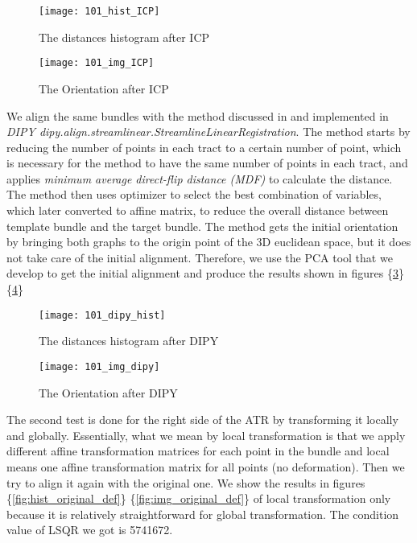 \documentclass[../structure.tex]{subfiles}
\begin{document}
\begin{figure}[h!]
\centering
\texttt{[image: 101\_hist\_ICP]}
\captionsetup{justification=centering}
\caption{The distances histogram after ICP}
\label{fig:hist_ICP}
\end{figure}

\begin{figure}[h!]
\centering
\texttt{[image: 101\_img\_ICP]}
\captionsetup{justification=centering}
\caption{The Orientation after ICP}
\label{fig:img_ICP}
\end{figure}
\pagebreak
We align the same bundles with the method discussed in \cite{Garyfallidis2012} and implemented in \textit{DIPY dipy.align.streamlinear.StreamlineLinearRegistration}. The method starts by reducing the number of points in each tract to a certain number of point, which is necessary for the method to have the same number of points in each tract, and applies \textit{minimum average direct-flip distance (MDF)} to calculate the distance. The method then uses optimizer to select the best combination of variables, which later converted to affine matrix, to reduce the overall distance between template bundle and the target bundle. The method gets the initial orientation by bringing both graphs to the origin point of the 3D euclidean space, but it does not take care of the initial alignment. Therefore, we use the PCA tool that we develop to get the initial alignment and produce the results shown in figures \{\ref{fig:dipy_hist}\} \{\ref{fig:img_dipy}\}

\begin{figure}[h!]
\centering
\texttt{[image: 101\_dipy\_hist]}
\captionsetup{justification=centering}
\caption{The distances histogram after DIPY}
\label{fig:dipy_hist}
\end{figure}

\begin{figure}[h!]
\centering
\texttt{[image: 101\_img\_dipy]}
\captionsetup{justification=centering}
\caption{The Orientation after DIPY}
\label{fig:img_dipy}
\end{figure}
\pagebreak

The second test is done for the right side of the ATR by transforming it locally and globally. Essentially, what we mean by local transformation is that we apply different affine transformation matrices for each point in the bundle and local means one affine transformation matrix for all points (no deformation). Then we try to align it again with the original one. We show the results in figures \{\ref{fig:hist_original_def}\} \{\ref{fig:img_original_def}\} of local transformation only because it is relatively straightforward for global transformation. The condition value of LSQR we got is 5741672.
\end{document}
